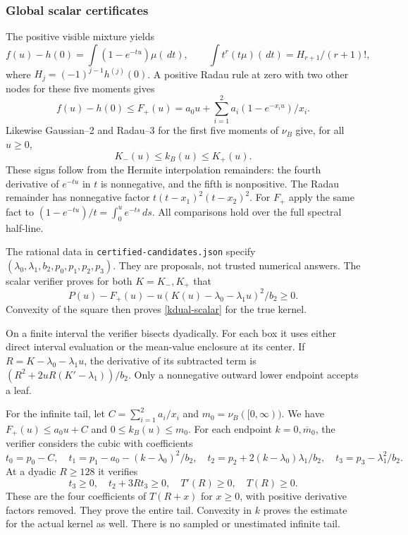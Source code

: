 \subsubsection{Global scalar certificates}
The positive visible mixture yields
\[
f(u)-h(0)=\int(1-e^{-tu})\mu(\,d t),\qquad
\int t^r(t\mu)(\,d t)=H_{r+1}/(r+1)!,
\]
where $H_j=(-1)^{j-1}h^{(j)}(0)$. A positive Radau rule at zero with
two other nodes for these five moments gives
\[
f(u)-h(0)\le F_+(u)=a_0u+\sum_{i=1}^2a_i(1-e^{-x_i u})/x_i.
\]
Likewise Gaussian--2 and Radau--3 for the first five moments of $\nu_B$
give, for all $u\ge0$,
\[
K_-(u)\le k_B(u)\le K_+(u).
\]
These signs follow from the Hermite interpolation remainders: the
fourth derivative of $e^{-tu}$ in $t$ is nonnegative, and the fifth is
nonpositive. The Radau remainder has nonnegative factor
$t(t-x_1)^2(t-x_2)^2$. For $F_+$ apply the same fact to
$(1-e^{-tu})/t=\int_0^u e^{-ts}\,d s$.
All comparisons hold over the full spectral half-line.

The rational data in \texttt{certified-candidates.json} specify
$(\lambda_0,\lambda_1,b_2,p_0,p_1,p_2,p_3)$. They are proposals,
not trusted numerical answers. The scalar verifier proves for both
$K=K_-,K_+$ that
\begin{equation}\label{kdual-gap}
P(u)-F_+(u)-u(K(u)-\lambda_0-\lambda_1u)^2/b_2\ge0.
\end{equation}
Convexity of the square then proves \eqref{kdual-scalar} for the true kernel.

On a finite interval the verifier bisects dyadically. For each box it
uses either direct interval evaluation or the mean-value enclosure
at its center. If $R=K-\lambda_0-\lambda_1u$, the derivative of its
subtracted term is $(R^2+2uR(K'-\lambda_1))/b_2$.
Only a nonnegative outward lower endpoint accepts a leaf.

For the infinite tail, let $C=\sum_{i=1}^2a_i/x_i$ and
$m_0=\nu_B([0,\infty))$. We have $F_+(u)\le a_0u+C$ and
$0\le k_B(u)\le m_0$. For each endpoint $k=0,\overline m_0$,
the verifier considers the cubic with coefficients
\[
t_0=p_0-C,\quad t_1=p_1-a_0-(k-\lambda_0)^2/b_2,\quad
t_2=p_2+2(k-\lambda_0)\lambda_1/b_2,\quad
t_3=p_3-\lambda_1^2/b_2.
\]
At a dyadic $R\ge128$ it verifies
\[
t_3\ge0,\quad t_2+3Rt_3\ge0,\quad T'(R)\ge0,\quad T(R)\ge0.
\]
These are the four coefficients of $T(R+x)$ for $x\ge0$, with
positive derivative factors removed. They prove the entire tail.
Convexity in $k$ proves the estimate for the actual kernel as well.
There is no sampled or unestimated infinite tail.

